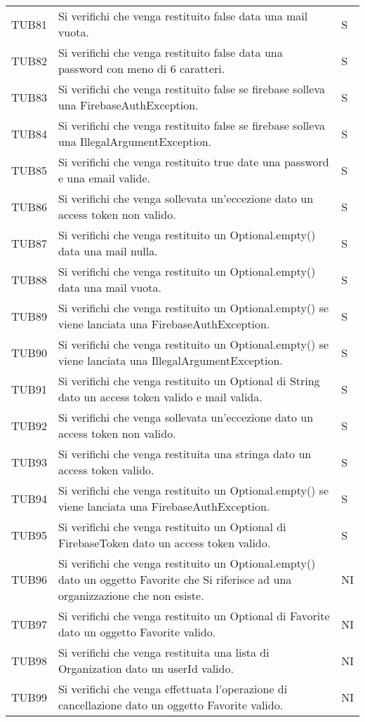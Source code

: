 {\begin{longtable}{ c C{13cm} C{1cm}}
TUB81 & Si verifichi che venga restituito false data una mail vuota. & S \\
TUB82 & Si verifichi che venga restituito false data una password con meno di 6 caratteri. & S \\
TUB83 & Si verifichi che venga restituito false se firebase solleva una FirebaseAuthException. & S \\
TUB84 & Si verifichi che venga restituito false se firebase solleva una IllegalArgumentException. & S \\
TUB85 & Si verifichi che venga restituito true date una password e una email valide. & S \\
TUB86 & Si verifichi che venga sollevata un'eccezione dato un access token non valido. & S \\
TUB87 & Si verifichi che venga restituito un Optional.empty() data una mail nulla. & S \\
TUB88 & Si verifichi che venga restituito un Optional.empty() data una mail vuota. & S \\
TUB89 & Si verifichi che venga restituito un Optional.empty() se viene lanciata una FirebaseAuthException. & S \\
TUB90 & Si verifichi che venga restituito un Optional.empty() se viene lanciata una IllegalArgumentException. & S \\
TUB91 & Si verifichi che venga restituito un Optional di String dato un access token valido e mail valida. & S \\
TUB92 & Si verifichi che venga sollevata un'eccezione dato un access token non valido. & S \\
TUB93 & Si verifichi che venga restituita una stringa dato un access token valido. & S \\
TUB94 & Si verifichi che venga restituito un Optional.empty() se viene lanciata una FirebaseAuthException. & S \\
TUB95 & Si verifichi che venga restituito un Optional di FirebaseToken dato un access token valido. & S \\
TUB96 & Si verifichi che venga restituito un Optional.empty() dato un oggetto Favorite che Si riferisce ad una organizzazione che non esiste. & NI \\
TUB97 & Si verifichi che venga restituito un Optional di Favorite dato un oggetto Favorite valido. & NI \\
TUB98 & Si verifichi che venga restituita una lista di Organization dato un userId valido. & NI \\
TUB99 & Si verifichi che venga effettuata l'operazione di cancellazione dato un oggetto Favorite valido. & NI \\

\end{longtable}}
